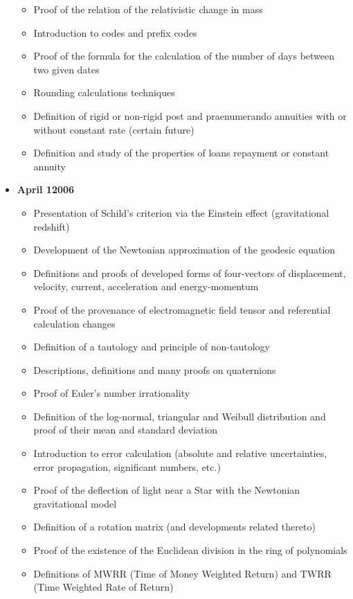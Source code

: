 \begin{itemize}
\begin{itemize}[noitemsep]
			\item Proof of the relation of the relativistic change in mass
			\item Introduction to codes and prefix codes
			\item Proof of the formula for the calculation of the number of days between two given dates 
			\item Rounding calculations techniques
			\item Definition of rigid or non-rigid post and praenumerando annuities with or without constant rate (certain future)
			\item Definition and study of the properties of loans repayment or constant annuity
		\end{itemize}
	\item \textbf{April 12006}
		\begin{itemize}[noitemsep]
			\item Presentation of Schild's criterion via the Einstein effect (gravitational redshift)
			\item Development of the Newtonian approximation of the geodesic equation
			\item Definitions and proofs of developed forms of four-vectors of displacement, velocity, current, acceleration and energy-momentum
			\item Proof of the provenance of electromagnetic field tensor and referential calculation changes
			\item Definition of a tautology and principle of non-tautology
			\item Descriptions, definitions and many proofs on quaternions
			\item Proof of Euler's number irrationality
			\item Definition of the log-normal, triangular and Weibull distribution and proof of their mean and standard deviation
			\item Introduction to error calculation (absolute and relative uncertainties, error propagation, significant numbers, etc.)
			\item Proof of the deflection of light near a Star with the Newtonian gravitational model
			\item Definition of a rotation matrix (and developments related thereto)
			\item Proof of the existence of the Euclidean division in the ring of polynomials
			\item Definitions of MWRR (Time of Money Weighted Return) and TWRR (Time Weighted Rate of Return)

\end{itemize}
\end{itemize}
